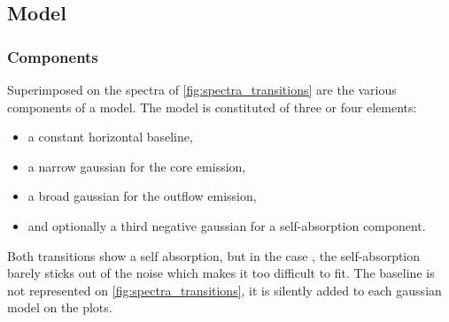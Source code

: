 \subsection{Model}
\subsubsection{Components}
Superimposed on the spectra of \cref{fig:spectra_transitions} are the various components of a model.
The model is constituted of three or four elements:
\begin{itemize}
    \item a constant horizontal baseline,
    \item a narrow gaussian for the core emission,
    \item a broad gaussian for the outflow emission,
    \item and optionally a third negative gaussian for a self-absorption component.
\end{itemize}
Both transitions show a self absorption, but in the case , the self-absorption barely sticks out of the noise which makes it too difficult to fit.
The baseline is not represented on \cref{fig:spectra_transitions}, it is silently added to each gaussian model on the plots.

